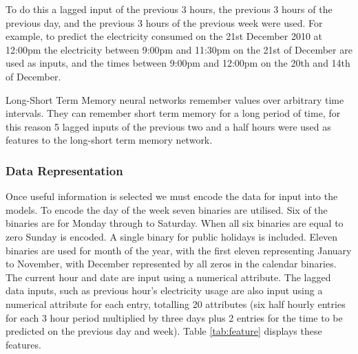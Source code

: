 To do this a lagged input of the previous 3 hours, the previous 3 hours of the previous day, and the previous 3 hours of the previous week were used. For example, to predict the electricity consumed on the 21st December 2010 at 12:00pm the electricity between 9:00pm and 11:30pm on the 21st of December are used as inputs, and the times between 9:00pm and 12:00pm on the 20th and 14th of December.

Long-Short Term Memory neural networks remember values over arbitrary time intervals. They can remember short term memory for a long period of time, for this reason 5 lagged inputs of the previous two and a half hours were used as features to the long-short term memory network.

\subsubsection{Data Representation}

Once useful information is selected we must encode the data for input into the models. To encode the day of the week seven binaries are utilised. Six of the binaries are for Monday through to Saturday. When all six binaries are equal to zero Sunday is encoded. A single binary for public holidays is included. Eleven binaries are used for month of the year, with the first eleven representing January to November, with December represented by all zeros in the calendar binaries. The current hour and date are input using a numerical attribute. The lagged data inputs, such as previous hour's electricity usage are also input using a numerical attribute for each entry, totalling 20 attributes (six half hourly entries for each 3 hour period multiplied by three days plus 2 entries for the time to be predicted on the previous day and week). Table \ref{tab:feature} displays these features.


